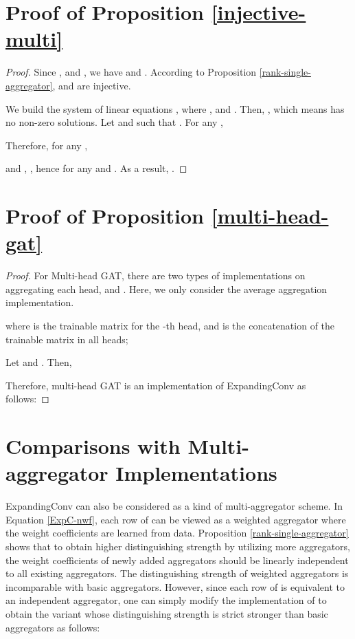 \documentclass{article} \usepackage{iclr2021_conference,times}
\begin{document}
\section{Proof of Proposition \ref{injective-multi}}
\label{proof-injective-multi}
\begin{proof}
Since ,  and ,
we have  and .
According to Proposition \ref{rank-single-aggregator},
 and  are injective.

We build the system of linear equations ,
where ,
and
.
Then, ,
which means  has no non-zero solutions.
Let  and 
such that .
For any ,

Therefore,
for any
,

and
,
,
hence  for any  and .
As a result,
.
\end{proof}


\section{Proof of Proposition \ref{multi-head-gat}}
\label{proof-multi-head-gat}

\begin{proof}
For Multi-head GAT, there are two types of implementations on aggregating each head,  and .
Here, we only consider the average aggregation implementation.

where
 is the trainable matrix for the -th head,
and  is the concatenation of the trainable matrix in all  heads;

Let 
and .
Then,


Therefore, multi-head GAT is an implementation of ExpandingConv as follows:

\end{proof}


\section{Comparisons with Multi-aggregator Implementations}
\label{mp-multi-aggregator}

ExpandingConv can also be considered as a kind of multi-aggregator scheme.
In Equation \ref{ExpC-nwf},
each row of  can be viewed as a weighted aggregator where the weight coefficients are learned from data.
Proposition \ref{rank-single-aggregator} shows that to obtain higher distinguishing strength by utilizing more aggregators,
the weight coefficients of newly added aggregators should be linearly independent to all existing aggregators.
The distinguishing strength of weighted aggregators is incomparable with basic aggregators.
However, since each row of  is equivalent to an independent aggregator,
one can simply modify the implementation of  to obtain the variant whose distinguishing strength is strict stronger than basic aggregators as follows:
\end{document}
